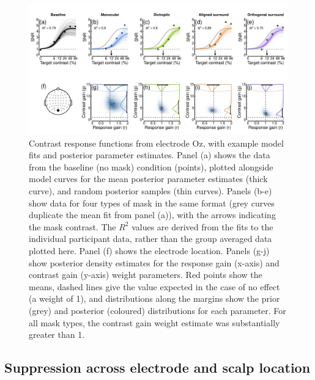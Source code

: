 \documentclass[]{article}
\begin{document}
\begin{figure}

{\centering \includegraphics{figures/modelfig1} 

}

\caption{Contrast response functions from electrode Oz, with example model fits and posterior parameter estimates. Panel (a) shows the data from the baseline (no mask) condition (points), plotted alongside model curves for the mean posterior parameter estimates (thick curve), and random posterior samples (thin curves). Panels (b-e) show data for four types of mask in the same format (grey curves duplicate the mean fit from panel (a)), with the arrows indicating the mask contrast. The $R^2$ values are derived from the fits to the individual participant data, rather than the group averaged data plotted here. Panel (f) shows the electrode location. Panels (g-j) show posterior density estimates for the response gain (x-axis) and contrast gain (y-axis) weight parameters. Red points show the means, dashed lines give the value expected in the case of no effect (a weight of 1), and distributions along the margins show the prior (grey) and posterior (coloured) distributions for each parameter. For all mask types, the contrast gain weight estimate was substantially greater than 1.}\label{fig:modelfig1}
\end{figure}

\hypertarget{suppression-across-electrode-and-scalp-location}{%
\subsection{Suppression across electrode and scalp location}\label{suppression-across-electrode-and-scalp-location}}
\end{document}
